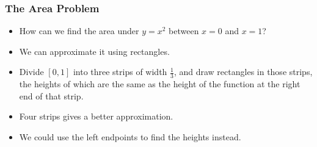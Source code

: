 

\begin{frame}
\frametitle{The Area Problem}
\begin{itemize}
\item  How can we find the area under $y = x^2$ between $x = 0$ and $x = 1$?
\item<handout:2-| 2->  We can approximate it using rectangles.
\item<handout:2-| 3->  Divide $[0,1]$ into three strips of width $\frac{1}{3}$, and draw rectangles in those strips, the heights of which are the same as the height of the function at the right end of that strip.
\item<handout:3-| 4->  Four strips gives a better approximation. 
\item<handout:6-| 11-19>  We could use the left endpoints to find the heights instead.
\end{itemize}


\end{frame}

